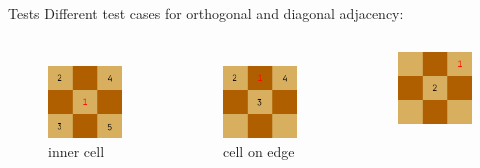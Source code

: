 \documentclass{beamer}
\begin{document}
\begin{frame}{Tests}
	Different test cases for orthogonal and diagonal adjacency:
\begin{columns}
	\begin{figure}
		\includegraphics[scale=0.15]{images/diagonal_inner.png}
		\\inner cell
	\end{figure}
	\begin{figure}
		\includegraphics[scale=0.15]{images/orthogonal_edge.png}
		\\cell on edge
	\end{figure}
	\begin{figure}
	\includegraphics[scale=0.15]{images/diagonal_corner.png}

\end{figure}
\end{columns}
\end{frame}
\end{document}
